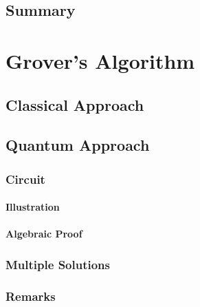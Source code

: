         \subsection{Summary} %

    \section{Grover's Algorithm} %

        \subsection{Classical Approach} %

        \subsection{Quantum Approach} %

            \subsubsection{Circuit} %

                \paragraph{Illustration} %

                \paragraph{Algebraic Proof} %

            \subsubsection{Multiple Solutions} %

            \subsubsection{Remarks} %

